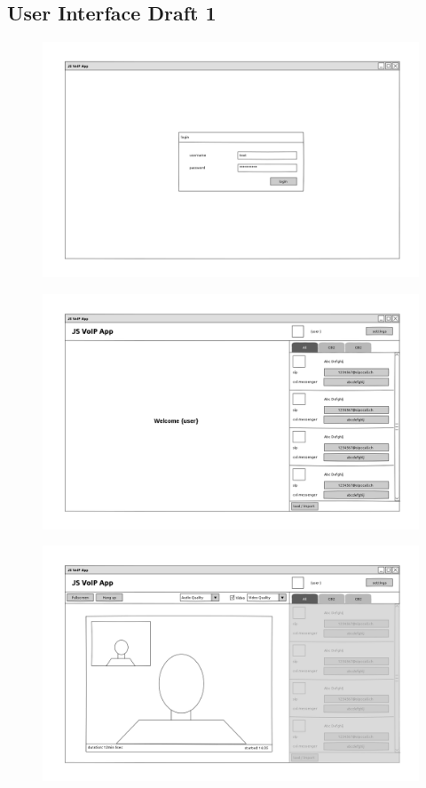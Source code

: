 \begin{landscape}
	\chapter{User Interface Draft 1}
		\begin{figure}[H]
			\centering
			\includegraphics[width=1.4\textwidth]{../ui/img/login_page.png}
			\label{login screen}
		\end{figure}
		\begin{figure}[H]
			\centering
			\includegraphics[width=1.4\textwidth]{../ui/img/main_view.png}
			\label{main screen}
		\end{figure}
		\begin{figure}[H]
			\centering
			\includegraphics[width=1.4\textwidth]{../ui/img/call_view.png}

\end{figure}
\end{landscape}

